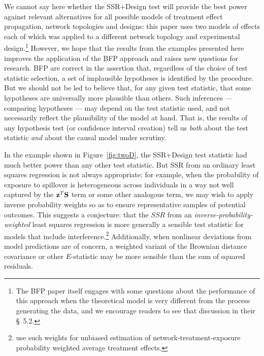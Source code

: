 We cannot say here whether the SSR+Design test will provide the best power
against relevant alternatives for all possible models of treatment effect
propagation, network topologies and designs: this paper uses two models of
effects each of which was applied to a different network topology and
experimental design.\footnote{The BFP paper itself engages with some questions about
the performance of this approach when the theoretical model is very different
from the process generating the data, and we encourage readers to see that
discussion in their \S~5.2.} However, we hope that the results from the 
examples presented here improves the application of the BFP approach and raises new
questions for research.  BFP are correct in the assertion that, regardless of
the choice of test statistic selection, a set of implausible hypotheses is
identified by the procedure. But we should not be led to believe that, for any
given test statistic, that some hypotheses are universally more plausible than others.
Such inferences --- comparing hypotheses --- may depend on the test statistic
used, and not necessarily reflect the plausibility of the model at hand. That
is, the results of any hypothesis test (or confidence interval creation) tell
us \emph{both} about the test statistic \emph{and} about the causal model under scrutiny.

In the example shown in Figure~\ref{fig:twoD}, the SSR+Design test statistic had much better power than
any other test statistic. But SSR from an ordinary least squares regression is
not always appropriate: for example, when the probability of exposure to
spillover is heterogeneous across individuals in a way not well captured by the
$\mathbf{z}^T \mathbf{S}$ term or some other analogous term, we may wish to apply inverse
probability weights so as to ensure representative samples of potential
outcomes. This suggests a conjecture: that the $SSR$ from an \emph{inverse-probability-weighted} least squares regression is more generally a
sensible test statistic for models that include
interference.\footnote{\citet{aronowsamii2012interfere} use such weights for
  unbiased estimation of network-treatment-exposure probability weighted
  average treatment effects.}  Additionally, when nonlinear deviations from
model predictions are of concern, a weighted variant of the Brownian distance
covariance \citep{szekely2009brownian} or other $E$-statistic may be more
sensible than the sum of squared residuals.


